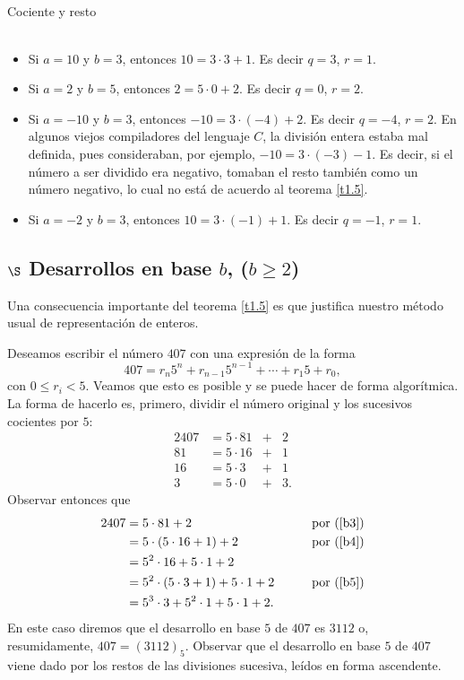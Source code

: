 \begin{section}{Cociente y resto}
\begin{ejemplo*} ${}^{}$ 

\begin{itemize}
\item Si $a=10$ y $b=3$, entonces $10 = 3 \cdot 3 +1$. Es decir $q= 3$, $r=1$. 
\item Si $a=2$ y $b=5$, entonces $2 = 5 \cdot 0 +2$. Es decir $q= 0$, $r=2$. 
\item Si $a=-10$ y $b=3$, entonces $-10 = 3 \cdot (-4) +2$. Es decir $q= -4$, $r=2$. En algunos viejos compiladores del lenguaje $C$, la división entera estaba mal definida, pues consideraban, por ejemplo, $-10 = 3 \cdot (-3) -1$. Es decir, si el número a ser dividido era negativo, tomaban el resto también como un número negativo, lo cual no está de acuerdo al teorema \ref{t1.5}.  
\item Si $a=-2$ y $b=3$, entonces $10 = 3 \cdot (-1) +1$. Es decir $q= -1$, $r=1$. 
\end{itemize}
\end{ejemplo*}

\subsection*{$\S$ Desarrollos en base $b$, ($b \ge 2$)}
    
    
Una consecuencia importante del teorema \ref{t1.5} es que
justifica nuestro método usual de representación de enteros. 

\begin{ejemplo*} Deseamos escribir el número $407$ con una expresión de la forma 
$$
407 = r_n5^n +r_{n-1} 5^{n-1}+\cdots + r_1 5 + r_0,
$$
con $0 \le r_i < 5$. Veamos que esto es posible y se puede hacer de forma algorítmica. La forma de hacerlo  es, primero, dividir el número original y los sucesivos cocientes por $5$:  
\begin{alignat}2
407 &=5\cdot 81 &+& 2 \label{b3}\\
81 & = 5\cdot 16 &+& 1  \label{b4}\\
16 & = 5\cdot 3 &+& 1  \label{b5}\\
3 & = 5\cdot 0 &+& 3.
\end{alignat}
Observar entonces que
\begin{alignat*}2
407 &=5\cdot 81 + 2  &\qquad& \text{por (\ref{b3})}\\
 &= 5\cdot (5\cdot 16 + 1) + 2  &\qquad& \text{por (\ref{b4})}\\
 &= 5^2 \cdot 16+ 5\cdot 1 + 2 &\qquad& \text{}\\
 &= 5^2 \cdot (5\cdot 3 + 1)+ 5\cdot 1 + 2   &\qquad& \text{por (\ref{b5})}\\
 &= 5^3 \cdot 3+ 5^2 \cdot 1 + 5\cdot 1 + 2.  &\qquad& \text{}
\end{alignat*}
En este caso diremos que el desarrollo en base $5$ de $407$ es $3112$ o, resumidamente, $407 = (3112)_5$.  Observar que el desarrollo en base $5$ de $407$ viene dado por los restos de las divisiones sucesiva, leídos en forma ascendente.
\end{ejemplo*}



\end{section}
